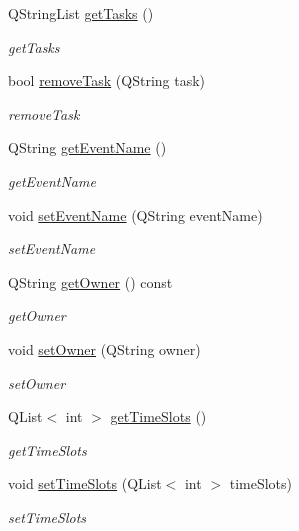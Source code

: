 \begin{DoxyCompactItemize}
Q\+String\+List \hyperlink{class_event_afd035786dd05f97c7a820878444306f6}{get\+Tasks} ()
\begin{DoxyCompactList}\small\item\em get\+Tasks \end{DoxyCompactList}\item 
bool \hyperlink{class_event_a81270b85694de5ceaa79ae4e6588d000}{remove\+Task} (Q\+String task)
\begin{DoxyCompactList}\small\item\em remove\+Task \end{DoxyCompactList}\item 
Q\+String \hyperlink{class_event_a2846f2dfad84c083d829fdf3d915c05a}{get\+Event\+Name} ()
\begin{DoxyCompactList}\small\item\em get\+Event\+Name \end{DoxyCompactList}\item 
void \hyperlink{class_event_a15b675acab68dd6a840421ec72aeef57}{set\+Event\+Name} (Q\+String event\+Name)
\begin{DoxyCompactList}\small\item\em set\+Event\+Name \end{DoxyCompactList}\item 
Q\+String \hyperlink{class_event_ab7e1dc08bd691aaf95ad994afdea6d2b}{get\+Owner} () const
\begin{DoxyCompactList}\small\item\em get\+Owner \end{DoxyCompactList}\item 
void \hyperlink{class_event_a4c5b75b1d4c162cb7489ee6a4ced8af0}{set\+Owner} (Q\+String owner)
\begin{DoxyCompactList}\small\item\em set\+Owner \end{DoxyCompactList}\item 
Q\+List$<$ int $>$ \hyperlink{class_event_ae105da8497f73e20c687060c5837e6f8}{get\+Time\+Slots} ()
\begin{DoxyCompactList}\small\item\em get\+Time\+Slots \end{DoxyCompactList}\item 
void \hyperlink{class_event_ad39ee28106d13c32165cb091a500f896}{set\+Time\+Slots} (Q\+List$<$ int $>$ time\+Slots)
\begin{DoxyCompactList}\small\item\em set\+Time\+Slots \end{DoxyCompactList}\item 

\end{DoxyCompactItemize}
